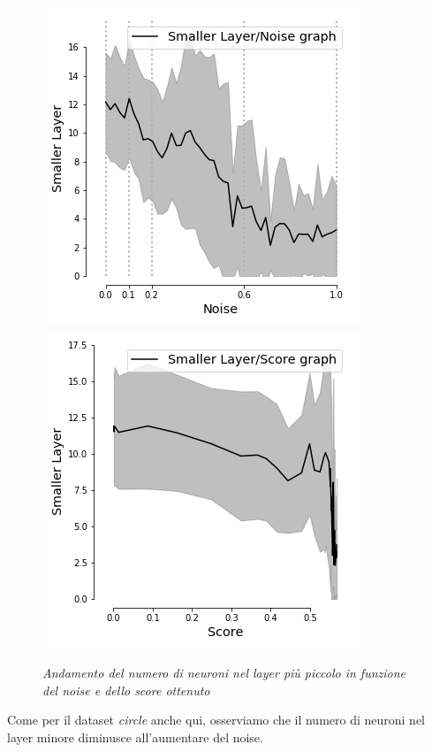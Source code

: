 \documentclass[12pt,a4paper]{report}
\begin{document}
\begin{figure}[H]
 \centering
 \includegraphics[scale = 0.5]{images/small_noise_circles+}
 \includegraphics[scale = 0.5]{images/small_Score_circles+}
 \caption{\textit{Andamento del numero di neuroni nel layer più piccolo in funzione del noise e dello score ottenuto}}
 \label{small-score-circle+}
\end{figure}

Come per il dataset \textit{circle} anche qui, osserviamo che il numero di neuroni nel layer minore diminusce all'aumentare del noise.
\end{document}
